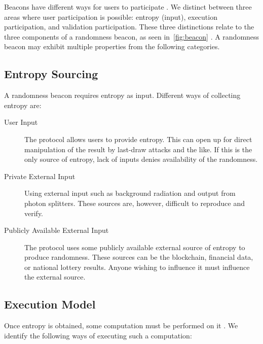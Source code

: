 Beacons have different ways for users to participate . We distinct between three areas where user participation is possible: entropy (input), execution participation, and validation participation. These three distinctions relate to the three components of a randomness beacon, as seen in~\vref{fig:beacon} . A randomness beacon may exhibit multiple properties from the following categories.

\subsection{Entropy Sourcing}
A randomness beacon requires entropy as input. Different ways of collecting entropy are:

\begin{description}
    \item [User Input] The protocol allows users to provide entropy. This can open up for direct manipulation of the result by last-draw attacks and the like. If this is the only source of entropy, lack of inputs denies availability of the randomness.
    \item [Private External Input] Using external input such as background radiation and output from photon splitters. These sources are, however, difficult to reproduce and verify.
    \item [Publicly Available External Input] The protocol uses some publicly available external source of entropy to produce randomness. These sources can be the blockchain, financial data, or national lottery results. Anyone wishing to influence it must influence the external source. 
\end{description}

\subsection{Execution Model}
Once entropy is obtained, some computation must be performed on it . We identify the following ways of executing such a computation:

